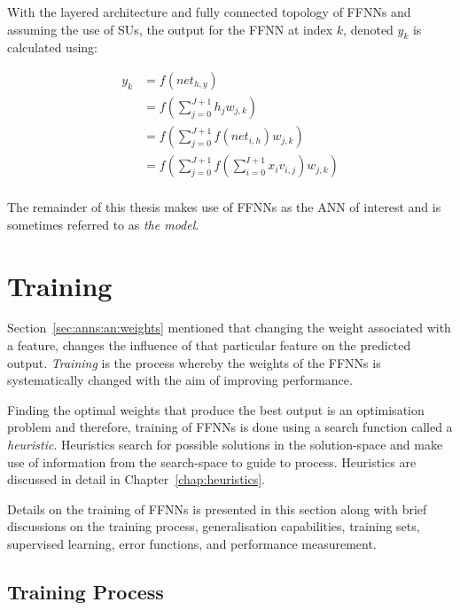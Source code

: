 With the layered architecture and fully
connected topology of \acp{FFNN} and assuming the use of \acp{SU}, the output
for the \ac{FFNN} at index $k$, denoted $y_k$ is calculated using:

\begin{equation}
    \label{eq:ffnn}
    \begin{split}
        y_k &= f\left(net_{h,y}\right) \\
            &= f\left(\sum_{j=0}^{J+1} h_j w_{j,k}\right) \\
            &= f\left(\sum_{j=0}^{J+1} f\left(net_{i,h}\right) w_{j,k}\right) \\
            &= f\left(\sum_{j=0}^{J+1} f\left(\sum_{i=0}^{I+1} x_i v_{i,j}\right) w_{j,k}\right) \\ 
    \end{split}
\end{equation}

\noindent The remainder of this thesis makes use of \acp{FFNN} as the \ac{ANN}
of interest and is sometimes referred to as \textit{the model}.


\section{Training}
\label{sec:anns:training}

Section~\ref{sec:anns:an:weights} mentioned that changing the weight associated
with a feature, changes the influence of that particular feature on the
predicted output. \textit{Training} is the process whereby the weights of the
\acp{FFNN} is systematically changed with the aim of improving performance.

Finding the optimal weights that produce the best output is an optimisation
problem and therefore, training of \acp{FFNN} is done using a search function
called a \textit{heuristic}. Heuristics search
for possible solutions in the solution-space and make use of information from
the search-space to guide to process. Heuristics are discussed in detail in
Chapter~\ref{chap:heuristics}.

Details on the training of \acp{FFNN} is presented in this section along with
brief discussions on the training process, generalisation capabilities, training
sets, supervised learning, error functions, and
performance measurement.

 
\subsection{Training Process}
\label{sec:anns:training:process}

